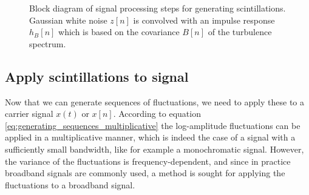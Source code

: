 \begin{figure}[H]
  \centering
{}
  \caption{Block diagram of signal processing steps for generating scintillations. Gaussian white noise $z[n]$ is convolved with an impulse response $h_B[n]$ which is based on the covariance $B[n]$ of the turbulence spectrum.}
  \label{fig:generating_block_diagram_simple}
\end{figure}

\subsection{Apply scintillations to signal}
Now that we can generate sequences of fluctuations, we need to apply these to a
carrier signal $x(t)$ or $x[n]$. According to equation
\eqref{eq:generating_sequences_multiplicative} the log-amplitude fluctuations can
be applied in a multiplicative manner, which is indeed the case of a signal with
a sufficiently small bandwidth, like for example a monochromatic signal.
However, the variance of the fluctuations is frequency-dependent, and since in
practice broadband signals are commonly used, a method is sought for applying the
fluctuations to a broadband signal.

